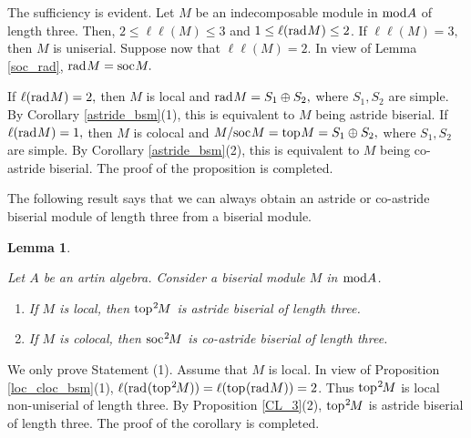 \documentclass[10pt]{amsart}
\newtheorem{Lemma}[Theo]{Lemma}
\theoremstyle{definition}
\newcommand{\mmod}{{\rm mod}}
\newcommand{\rad}{{\rm rad}\hspace{.5pt}}
\newcommand{\soc}{{\rm soc}\hspace{.5pt}}
\newcommand{\ntop}{{\rm top}\hspace{.5pt}}
\begin{document}
\vspace{-2pt}

 The sufficiency is evident. Let $M$ be an indecomposable module in $\mmod A$ of length three. Then, $2\le \ell\ell(M) \le 3$ and $1\le \ell(\rad M)\le 2$. If $\ell\ell(M)=3,$ then $M$ is uniserial. Suppose now that $\ell\ell(M)=2$. In view of Lemma \ref{soc_rad}, $\rad M=\soc M.$  

If $\ell(\rad M)=2,$ then $M$ is local and $\rad M=S_1\oplus S_2,$ where $S_1, S_2$ are simple. By Corollary \ref{astride_bsm}(1), this is equivalent to $M$ being astride biserial. If $\ell(\rad M)=1,$ then $M$ is colocal and $M/\soc M=\ntop M=S_1\oplus S_2,$ where $S_1, S_2$ are simple. By Corollary \ref{astride_bsm}(2), this is equivalent to $M$ being co-astride biserial. The proof of the proposition is completed.

\smallskip

The following result says that we can always obtain an astride or co-astride biserial module of length three from a biserial module.

\begin{Lemma}\label{bsm_top2}

Let $A$ be an artin algebra. Consider a biserial module $M$ in $\mmod A$. 

\begin{enumerate}[$(1)$]

\vspace{-1.5pt}

\item If $M$ is local, then $\ntop^2\hspace{-1pt}M$ is astride biserial of length three.

\vspace{.5pt}

\item If $M$ is colocal, then $\soc^2\hspace{-1pt}M$ is co-astride biserial of length three.

\end{enumerate}\end{Lemma}

\vspace{-1.5pt}

 We only prove Statement (1). Assume that $M$ is local. In view of Proposition \ref{loc_cloc_bsm}(1), $\ell(\rad(\ntop^2\hspace{-1pt}M))=\ell(\ntop(\rad M))=2$. Thus $\ntop^2\hspace{-1pt}M$ is local non-uniserial of length three. By Proposition \ref{CL_3}(2), $\ntop^2\hspace{-1pt}M$ is astride biserial of length three. The proof of the corollary is completed.
\end{document}
